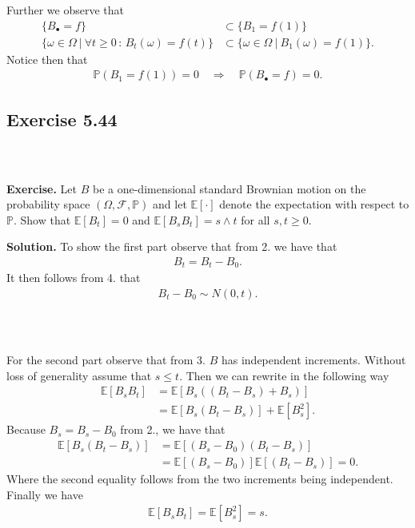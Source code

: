 \documentclass{beamer}
\numberwithin{equation}{section}
\newenvironment{frame2}{\begin{frame}\frametitle{{\normalsize \secname} \\ {\large \subsecname}}}{\end{frame}}
\begin{document}
\begin{frame2}
    Further we observe that
    \begin{align*}
        \{B_\bullet = f\} &\subset \{B_1 = f(1)\} \\
        \{\omega \in \Omega \ | \ \forall t\geq 0\,:\, B_t(\omega) = f(t)\} &\subset \{\omega \in \Omega \ | \ B_1(\omega) = f(1)\}.
    \end{align*}
    Notice then that
    \begin{align}
        \mathbb{P}(B_1 = f(1)) = 0 \quad \Rightarrow \quad \mathbb{P}(B_\bullet = f) = 0.
    \end{align}
\end{frame2}

\subsection{Exercise 5.44}

\begin{frame2}
    \textbf{Exercise.} 
    Let $B$ be a one-dimensional standard Brownian motion on the probability space $(\Omega, \mathcal{F}, \mathbb{P})$ and let $\mathbb{E}[\cdot]$ denote the expectation with respect to $\mathbb{P}$.
    Show that $\mathbb{E}[B_t] = 0$ and $\mathbb{E}[B_s B_t] = s \wedge t$ for all $s,t \geq 0$.

    \vspace{10pt}
    \textbf{Solution.}
    To show the first part observe that from 2.\! we have that
    \begin{align}
        B_t = B_t - B_0.
    \end{align}
    It then follows from 4.\! that
    \begin{align}
        B_t - B_0 \sim N(0,t).
    \end{align}
\end{frame2}

\begin{frame2}
    For the second part observe that from 3.\! $B$ has independent increments.
    Without loss of generality assume that $s \leq t$.
    Then we can rewrite in the following way
    \begin{align}
        \mathbb{E}[B_sB_t] &= \mathbb{E}[B_s((B_t - B_s) + B_s)] \\
        &= \mathbb{E}[B_s(B_t - B_s)] + \mathbb{E}[B_s^2].
    \end{align}
    Because $B_s = B_s - B_0$ from 2., we have that
    \begin{align}
        \mathbb{E}[B_s(B_t - B_s)] &= \mathbb{E}[(B_s - B_0)(B_t - B_s)] \\
        &= \mathbb{E}[(B_s - B_0)]\mathbb{E}[(B_t - B_s)] = 0.
    \end{align} 
    Where the second equality follows from the two increments being independent.
    Finally we have
    \begin{align}
        \mathbb{E}[B_sB_t] = \mathbb{E}[B_s^2] = s.
    \end{align}
\end{frame2}
\end{document}
